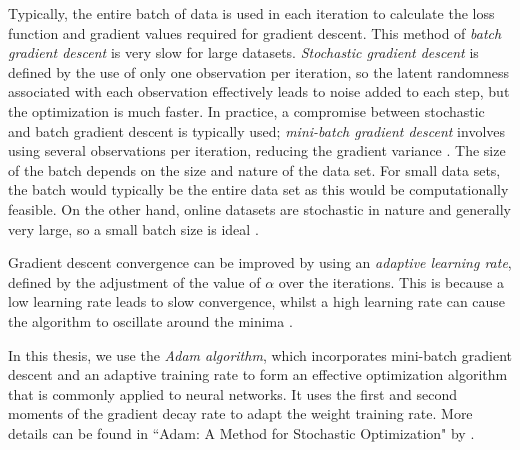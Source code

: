 \documentclass[honours,12pt, twoside]{unswthesis}
\numberwithin{equation}{section}
\theoremstyle{definition}
\begin{document}
Typically, the entire batch of data is used in each iteration to calculate the loss function and gradient values required for gradient descent. This method of \textit{batch gradient descent} is very slow for large datasets. \textit{Stochastic gradient descent} is defined by the use of only one observation per iteration, so the latent randomness associated with each observation effectively leads to noise added to each step, but the optimization is much faster. In practice, a compromise between stochastic and batch gradient descent is typically used; \textit{mini-batch gradient descent} involves using several observations per iteration, reducing the gradient variance \citep{batch, optimneural}. The size of the batch depends on the size and nature of the data set. For small data sets, the batch would typically be the entire data set as this would be computationally feasible. On the other hand, online datasets are stochastic in nature and generally very large, so a small batch size is ideal \citep{bengio}.

Gradient descent convergence can be improved by using an \textit{adaptive learning rate}, defined by the adjustment of the value of $\alpha$ over the iterations. This is because a low learning rate leads to slow convergence, whilst a high learning rate can cause the algorithm to oscillate around the minima \citep{optimneural}.

In this thesis, we use the \textit{Adam algorithm}, which incorporates mini-batch gradient descent and an adaptive training rate to form an effective optimization algorithm that is commonly applied to neural networks. It uses the first and second moments of the gradient decay rate to adapt the weight training rate. More details can be found in ``Adam: A Method for Stochastic Optimization" by \citet{adam}.
\end{document}
